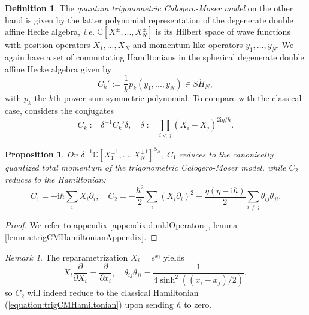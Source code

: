 \documentclass[11pt]{report}
\newtheorem{prop}[theorem]{Proposition}
\theoremstyle{definition}
\newtheorem{definition}[theorem]{Definition}
\theoremstyle{remark}
\newtheorem*{remark}{Remark}
\theoremstyle{remark}
\newcommand{\C}{\mathbb{C}}
\newcommand{\I}{\mathrm{i}}
\begin{document}
\begin{definition}
The \emph{quantum trigonometric Calogero-Moser model} on the other hand is given by the latter polynomial representation of the degenerate double affine Hecke algebra, \emph{i.e.} $\C[X_1^\pm,...,X_N^\pm]$ is its Hilbert space of wave functions with position operators $X_1,...,X_N$ and momentum-like operators $y_1,...,y_N$. We again have a set of commutating Hamiltonians in the spherical degenerate double affine Hecke algebra given by
\begin{equation*}
C_k' := \frac{1}{k} p_k(y_1,...,y_N) \in S\ddot H_N,
\end{equation*}
with $p_k$ the $k$th power sum symmetric polynomial. To compare with the classical case, \cite{article:etingof:2009} considers the conjugates
\begin{equation*}
C_k := \delta^{-1} C_k' \delta, \quad \delta := \prod_{i < j} (X_i-X_j)^{2 \I \eta / \hbar}.
\end{equation*}
\end{definition}

\begin{prop}\label{prop:trigCMHamiltonian}
On $\delta^{-1} \C[X_1^{\pm 1},...,X_N^{\pm 1}]^{S_N}$, $C_1$ reduces to the canonically quantized total momentum of the trigonometric Calogero-Moser model, while $C_2$ reduces to the Hamiltonian:
\begin{equation*}
C_1 = -\I \hbar \sum_i X_i \partial_i, \quad C_2 = -\frac{\hbar^2}{2} \sum_i (X_i \partial_i)^2 + \frac{\eta(\eta-\I \hbar)}{2} \sum_{i \neq j} \theta_{ij} \theta_{ji}.
\end{equation*}
\end{prop}

\begin{proof}
We refer to appendix \ref{appendix:dunklOperators}, lemma \ref{lemma:trigCMHamiltonianAppendix}.
\end{proof}

\begin{remark}
The reparametrization $X_i = e^{x_i}$ yields
\begin{equation*}
X_i \frac{\partial}{\partial X_i} = \frac{\partial}{\partial x_i}, \quad \theta_{ij} \theta_{ji} = \frac{1}{4\sinh^2((x_i-x_j)/2)},
\end{equation*}
so $C_2$ will indeed reduce to the classical Hamiltonian (\ref{equation:trigCMHamiltonian}) upon sending $\hbar$ to zero.
\end{remark}
\end{document}
